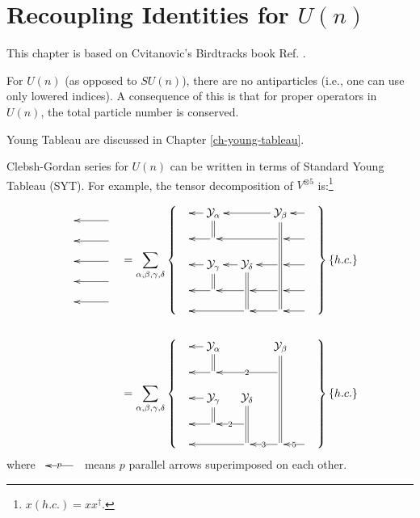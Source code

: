\chapter{Recoupling Identities for $U(n)$}
\label{ch-recoupling-for-un}

This chapter is based on Cvitanovic's Birdtracks book Ref. \cite{birdtracks-book}.

For $U(n)$ (as opposed to $SU(n)$), there are no antiparticles (i.e., one can use only lowered indices).
A consequence of this is  that for proper
operators in $U(n)$, the total particle number is conserved.

Young Tableau are
discussed in Chapter
\ref{ch-young-tableau}. 

Clebsh-Gordan series
for $U(n)$ can be written in terms
of Standard Young Tableau (SYT).
For example,
the tensor 
decomposition
of $V^{\otimes 5}$ is:\footnote{
$x (h.c.)=x x^\dagger$.
}


\begin{align}
\bcen
\xymatrix@C=1pc@R=1pc{
&&\ar[ll]
\\
&&\ar[ll]
\\
&&\ar[ll]
\\
&&\ar[ll]
\\
&&\ar[ll]
}\ecen
&=
\sum_{
{\alp},
{\beta},
{\gamma},
{\delta}
}
\left\{\bcen
\xymatrix@R=1pc@C=1pc{
&\caly_{\alp}
\ar@2{-}[d]\ar[l]
&&
\caly_{\beta}
\ar@2{-}[dddd]
\ar[ll]
&\ar[l]
\\
&\ar[l]
&&\ar[ll]
&\ar[l]
\\
&\ar[l]
\caly_{\gamma}
\ar@2{-}[d]
&\caly_{\delta}
\ar@2{-}[dd]\ar[l]
&\ar[l]
&\ar[l]
\\
&\ar[l]
&\ar[l]
&\ar[l]
&\ar[l]
\\
&
&\ar[ll]
&
\ar[l]
&\ar[l]
}
\ecen
\right\}
\left\{h.c.\right\}
\\
&\nonumber
\\
&=
\sum_{
{\alp},
{\beta},
{\gamma},
{\delta}
}
\left\{\bcen
\xymatrix@R=1pc@C=1pc{
&\caly_{\alp}
\ar@2{-}[d]\ar[l]
&&
\caly_{\beta}
\ar@2{-}[dddd]
\\
&\ar[l]
&&\ar[ll]|2
&
\\
&\ar[l]
\caly_{\gamma}
\ar@2{-}[d]
&\caly_{\delta}
\ar@2{-}[dd]&
&
\\
&\ar[l]
&\ar[l]|2
&
&
\\
&&\ar[ll]&
\ar[l]|3
&\ar[l]|5
}
\ecen
\right\}
\left\{h.c.\right\}
\end{align}
where 
$ \xymatrix{&\ar[l]|p}
$
means $p$
parallel
arrows 
superimposed on each other.


